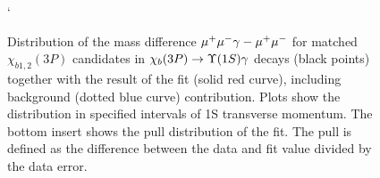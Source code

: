 \begin{figure}[H]
{\begin{picture}
  \end{picture}
  }
  \caption {\small 
    Distribution of the mass difference $\mumu \gamma - \mumu$ for matched
    $\chi_{b1,2}(3P)$ candidates in $\chibThreeP \to \Y1S \gamma$ decays
    (black points) together with the result of the fit (solid red curve),
    including background (dotted blue curve) contribution. Plots show the
    distribution in specified intervals of \Y1S transverse momentum. The bottom
    insert shows the  pull distribution of the fit. The pull is defined as the
    difference  between the data and fit value divided by the data error. }`
  \label{fig:mc:ups1s:fits3p}
\end{figure}